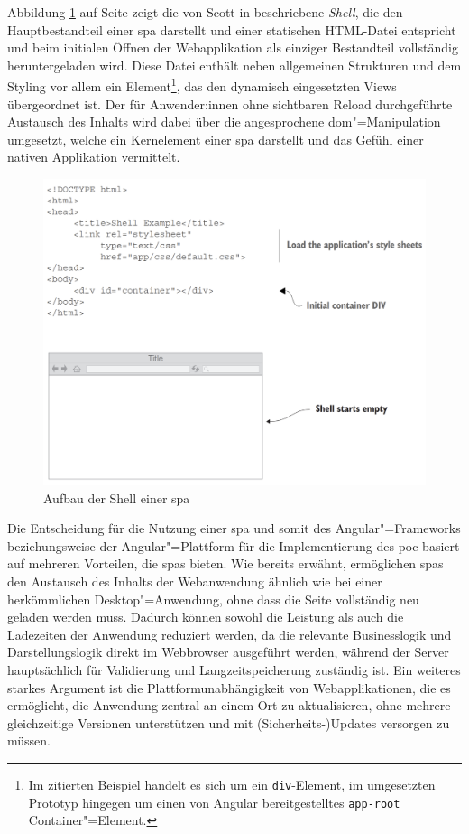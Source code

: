 \documentclass[a4paper,12pt,twoside]{scrreprt}
\begin{document}
Abbildung \ref{fig:scott-spa-shell} auf Seite \pageref{fig:scott-spa-shell} zeigt die von Scott in \cite{scott_spa_2015} beschriebene \textit{Shell}, die den Hauptbestandteil einer \ac{spa} darstellt und  einer statischen HTML-Datei entspricht und beim initialen Öffnen der Webapplikation als einziger Bestandteil vollständig heruntergeladen wird. Diese Datei enthält neben allgemeinen Strukturen und dem Styling vor allem ein Element\footnote{Im zitierten Beispiel handelt es sich um ein \texttt{div}-Element, im umgesetzten Prototyp hingegen um einen von Angular bereitgestelltes \texttt{app-root} Container"=Element.}, das den dynamisch eingesetzten Views übergeordnet ist. Der für Anwender:innen ohne sichtbaren Reload durchgeführte Austausch des Inhalts wird dabei über die angesprochene \ac{dom}"=Manipulation umgesetzt, welche ein Kernelement einer \ac{spa} darstellt und das Gefühl einer nativen Applikation vermittelt. \cite[8, 10\psqq]{scott_spa_2015}

\begin{figure}[ht]
    \centering
    \includegraphics[width=.8\linewidth]{thesis/images/Scott_SPA-Shell.png}
    \caption[Aufbau der Shell einer \acs{spa}]{Aufbau der Shell einer \acs{spa} \cite[8]{scott_spa_2015}}
    \label{fig:scott-spa-shell}
\end{figure}

Die Entscheidung für die Nutzung einer \ac{spa} und somit des Angular"=Frameworks beziehungsweise der Angular"=Plattform für die Implementierung des \ac{poc} basiert auf mehreren Vorteilen, die \acp{spa} bieten. Wie bereits erwähnt, ermöglichen \acp{spa} den Austausch des Inhalts der Webanwendung ähnlich wie bei einer herkömmlichen Desktop"=Anwendung, ohne dass die Seite vollständig neu geladen werden muss. Dadurch können sowohl die Leistung als auch die Ladezeiten der Anwendung reduziert werden, da die relevante Businesslogik und Darstellungslogik direkt im Webbrowser ausgeführt werden, während der Server hauptsächlich für Validierung und Langzeitspeicherung zuständig ist. Ein weiteres starkes Argument ist die Plattformunabhängigkeit von Webapplikationen, die es ermöglicht, die Anwendung zentral an einem Ort zu aktualisieren, ohne mehrere gleichzeitige Versionen unterstützen und mit (Sicherheits-)Updates versorgen zu müssen. \cite[20\psq]{mikowski_single_2013}
\end{document}
